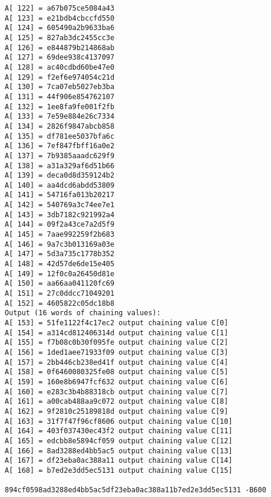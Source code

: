 \begin{verbatim}
A[ 122] = a67b075ce5084a43
A[ 123] = e21bdb4cbccfd550
A[ 124] = 605490a2b9633ba6
A[ 125] = 827ab3dc2455cc3e
A[ 126] = e844879b214868ab
A[ 127] = 69dee938c4137097
A[ 128] = ac40cdbd60be47e0
A[ 129] = f2ef6e974054c21d
A[ 130] = 7ca07eb5027eb3ba
A[ 131] = 44f906e854762107
A[ 132] = 1ee8fa9fe001f2fb
A[ 133] = 7e59e884e26c7334
A[ 134] = 2826f9847abcb858
A[ 135] = df781ee5037bfa6c
A[ 136] = 7ef847fbff16a0e2
A[ 137] = 7b9385aaadc629f9
A[ 138] = a31a329af6d51b66
A[ 139] = deca0d8d359124b2
A[ 140] = aa4dcd6abdd53809
A[ 141] = 54716fa013b20217
A[ 142] = 540769a3c74ee7e1
A[ 143] = 3db7182c921992a4
A[ 144] = 09f2a43ce7a2d5f9
A[ 145] = 7aae992259f2b683
A[ 146] = 9a7c3b013169a03e
A[ 147] = 5d3a735c1778b352
A[ 148] = 42d57de6de15e405
A[ 149] = 12f0c0a26450d81e
A[ 150] = aa66aa041120fc69
A[ 151] = 27c0ddcc71049201
A[ 152] = 4605822c05dc18b8
Output (16 words of chaining values):
A[ 153] = 51fe1122f4c17ec2 output chaining value C[0]
A[ 154] = a314cd812406314d output chaining value C[1]
A[ 155] = f7b08c0b30f095fe output chaining value C[2]
A[ 156] = 1ded1aee71933f09 output chaining value C[3]
A[ 157] = 2bb446cb238ed41f output chaining value C[4]
A[ 158] = 0f6460080325fe08 output chaining value C[5]
A[ 159] = 160e8b6947fcf632 output chaining value C[6]
A[ 160] = e283c3b4b88318cb output chaining value C[7]
A[ 161] = a00cab488aa9c072 output chaining value C[8]
A[ 162] = 9f2810c25189818d output chaining value C[9]
A[ 163] = 31f7f47f96cf8606 output chaining value C[10]
A[ 164] = 403f037430ec43f2 output chaining value C[11]
A[ 165] = edcbb8e5894cf059 output chaining value C[12]
A[ 166] = 8ad3288ed4bb5ac5 output chaining value C[13]
A[ 167] = df23eba0ac388a11 output chaining value C[14]
A[ 168] = b7ed2e3dd5ec5131 output chaining value C[15]

894cf0598ad3288ed4bb5ac5df23eba0ac388a11b7ed2e3dd5ec5131 -B600

\end{verbatim}

